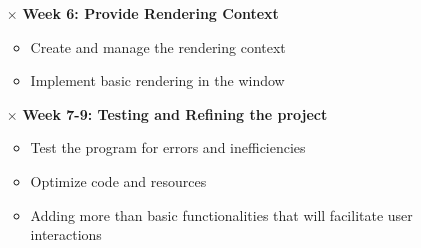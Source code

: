 \documentclass{article}
\begin{document}
\begin{itemize}
    \item[$\times$] \textbf{Week 6: Provide Rendering Context}
    \begin{itemize}
        \item Create and manage the rendering context
        \item Implement basic rendering in the window
    \end{itemize}
    
    \item[$\times$] \textbf{Week 7-9: Testing and Refining the project}
    \begin{itemize}
        \item Test the program for errors and inefficiencies
        \item Optimize code and resources
        \item Adding more than basic functionalities that will facilitate user interactions
    \end{itemize}
\end{itemize}
\end{document}
